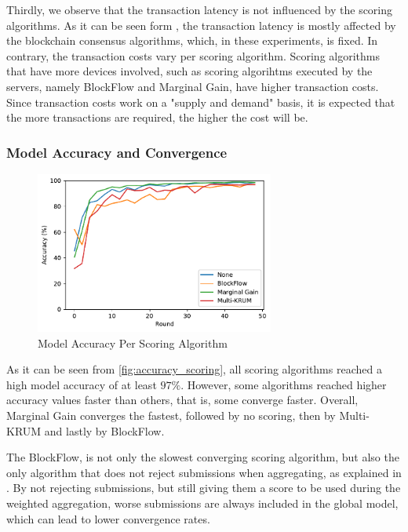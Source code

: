Thirdly, we observe that the transaction latency is not influenced by the scoring algorithms. As it can be seen form , the transaction latency is mostly affected by the blockchain consensus algorithms, which, in these experiments, is fixed. In contrary, the transaction costs vary per scoring algorithm. Scoring algorithms that have more devices involved, such as scoring algorihtms executed by the servers, namely BlockFlow and Marginal Gain, have higher transaction costs. Since transaction costs work on a "supply and demand" basis, it is expected that the more transactions are required, the higher the cost will be.

\subsubsection{Model Accuracy and Convergence}

\begin{figure}[!ht]
    \centering
    \centering
    \includegraphics[width=0.7\textwidth]{graphics/scoring/accuracy.pdf}
    \caption{Model Accuracy Per Scoring Algorithm}
    \label{fig:accuracy_scoring}
\end{figure}

As it can be seen from \autoref{fig:accuracy_scoring}, all scoring algorithms reached a high model accuracy of at least  $97\%$. However, some algorithms reached higher accuracy values faster than others, that is, some converge faster. Overall, Marginal Gain converges the fastest, followed by no scoring, then by Multi-KRUM and lastly by BlockFlow.

The BlockFlow, is not only the slowest converging scoring algorithm, but also the only algorithm that does not reject submissions when aggregating, as explained in . By not rejecting submissions, but still giving them a score to be used during the weighted aggregation, worse submissions are always included in the global model, which can lead to lower convergence rates. 

